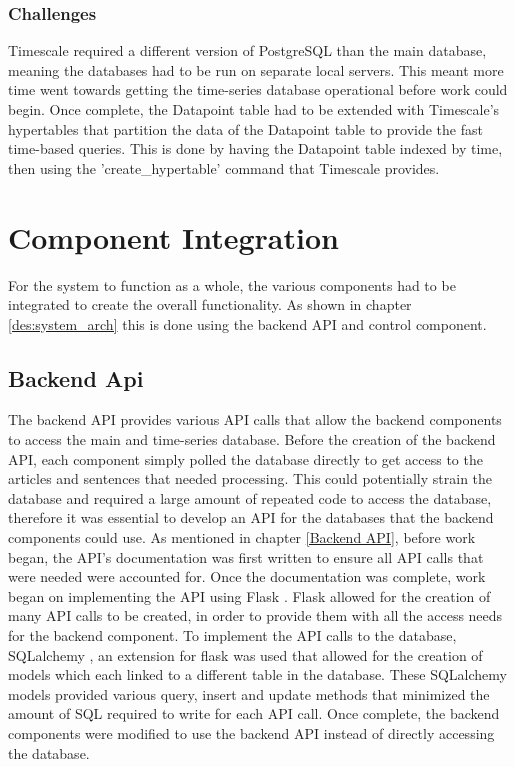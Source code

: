             \subsubsection{Challenges}
            Timescale required a different version of PostgreSQL than the main database, meaning the databases had to be run on separate local servers. This meant more time went towards getting the time-series database operational before work could begin. Once complete, the Datapoint table had to be extended with Timescale's hypertables that partition the data of the Datapoint table to provide the fast time-based queries. This is done by having the Datapoint table indexed by time, then using the 'create\_hypertable' command that Timescale provides.

    \section{Component Integration}
    For the system to function as a whole, the various components had to be integrated to create the overall functionality. As shown in chapter \ref{des:system_arch} this is done using the backend API and control component.
    
        \subsection{Backend Api}
        The backend API provides various API calls that allow the backend components to access the main and time-series database. Before the creation of the backend API, each component simply polled the database directly to get access to the articles and sentences that needed processing. This could potentially strain the database and required a large amount of repeated code to access the database, therefore it was essential to develop an API for the databases that the backend components could use. As mentioned in chapter \ref{Backend API}, before work began, the API's documentation was first written to ensure all API calls that were needed were accounted for. Once the documentation was complete, work began on implementing the API using Flask \citep{technology:Flask}. Flask allowed for the creation of many API calls to be created, in order to provide them with all the access needs for the backend component. To implement the API calls to the database, SQLalchemy \citep{technology:sqlalchemy}, an extension for flask was used that allowed for the creation of models which each linked to a different table in the database. These SQLalchemy models provided various query, insert and update methods that minimized the amount of SQL required to write for each API call. Once complete, the backend components were modified to use the backend API instead of directly accessing the database.
    
